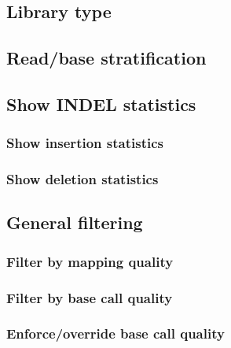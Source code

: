 \documentclass[10pt,a4paper,final]{article}
\begin{document}
\subsection{Library type}



\subsection{Read/base stratification}

\subsection{Show INDEL statistics}
\subsubsection{Show insertion statistics}

\subsubsection{Show deletion statistics}

\subsection{General filtering}
\subsubsection{Filter by mapping quality}



\subsubsection{Filter by base call quality}



\subsubsection{Enforce/override base call quality}

\end{document}
